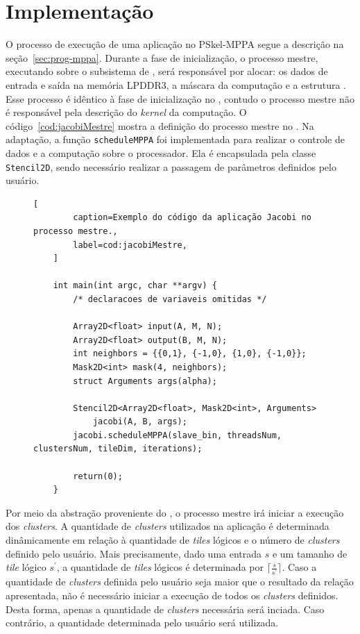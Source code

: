 \section{Implementação}

O processo de execução de uma aplicação no PSkel-MPPA segue a descrição na
seção~\ref{sec:prog-mppa}. Durante a fase de inicialização, o processo mestre, executando sobre o
subsistema de \es, será responsável por alocar: os dados de entrada e saída na
memória LPDDR3, a máscara da computação e a estrutura \stencil. Esse processo
é idêntico à fase de inicialização no \pskel, contudo o processo mestre não é
responsável pela descrição do \textit{kernel} da computação. O
código~\ref{cod:jacobiMestre} mostra a definição do processo mestre no \mppa.
Na adaptação, a função \texttt{scheduleMPPA} foi implementada para realizar o controle de dados e
a computação sobre o processador. Ela é encapsulada pela classe
\texttt{Stencil2D}, sendo necessário realizar a passagem de parâmetros definidos
pelo usuário.

\begin{figure}[t]
	\begin{lstlisting}[
		caption=Exemplo do código da aplicação Jacobi no processo mestre.,
		label=cod:jacobiMestre,
	]

	int main(int argc, char **argv) {
		/* declaracoes de variaveis omitidas */

		Array2D<float> input(A, M, N);
		Array2D<float> output(B, M, N);
		int neighbors = {{0,1}, {-1,0}, {1,0}, {-1,0}};
		Mask2D<int> mask(4, neighbors);
		struct Arguments args(alpha);

		Stencil2D<Array2D<float>, Mask2D<int>, Arguments>
			jacobi(A, B, args);
		jacobi.scheduleMPPA(slave_bin, threadsNum, clustersNum, tileDim, iterations);

		return(0);
	}
\end{lstlisting}
\end{figure}



Por meio da abstração proveniente do \pskel, o processo mestre irá iniciar a
execução dos \textit{clusters}. A quantidade de \textit{clusters} utilizados na
aplicação é determinada dinâmicamente em relação à quantidade de \textit{tiles}
lógicos e o número de \textit{clusters} definido pelo usuário.  Mais
precisamente, dado uma entrada $s$ e um tamanho de \textit{tile} lógico
$s^\prime$, a quantidade de \textit{tiles} lógicos é determinada por
$\lceil\frac{s}{s^\prime}\rceil$. Caso a quantidade de \textit{clusters}
definida pelo usuário seja maior que o resultado da relação apresentada, não é
necessário iniciar a execução de todos os \textit{clusters} definidos. Desta
forma, apenas a quantidade de \textit{clusters} necessária será inciada. Caso
contrário, a quantidade determinada pelo usuário será utilizada.

